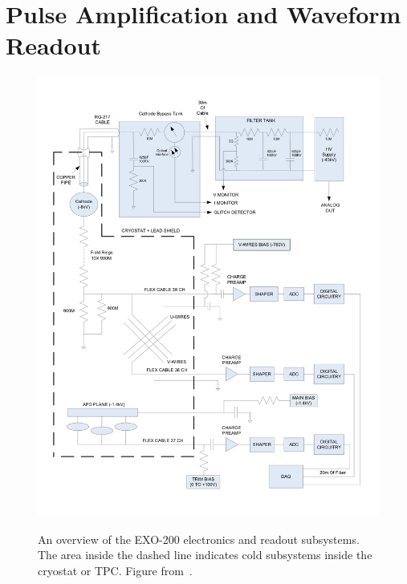 \section{Pulse Amplification and Waveform Readout}\label{sec:DetectorReadout}

\begin{figure}
\begin{center}
\includegraphics[keepaspectratio=true,width=\textwidth]{FrontEndElectronicsSchematic.png}
\end{center}
\renewcommand{\baselinestretch}{1}
\small\normalsize
\begin{quote}
\caption{An overview of the EXO-200 electronics and readout subsystems.  The area inside the dashed line indicates cold subsystems inside the cryostat or TPC.  Figure from~\cite{detectorPartI}.}
\label{fig:ElectronicsAndReadoutSchematic}
\end{quote}
\end{figure}
\renewcommand{\baselinestretch}{2}
\small\normalsize

